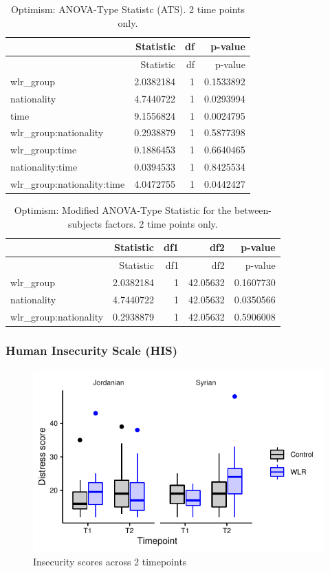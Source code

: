 \documentclass[]{article}
\begin{document}
\begin{longtable}[]{@{}lrrr@{}}
\caption{Optimism: ANOVA-Type Statistc (ATS). 2 time points
only.}\tabularnewline
\toprule
& Statistic & df & p-value\tabularnewline
\midrule
\endfirsthead
\toprule
& Statistic & df & p-value\tabularnewline
\midrule
\endhead
wlr\_group & 2.0382184 & 1 & 0.1533892\tabularnewline
nationality & 4.7440722 & 1 & 0.0293994\tabularnewline
time & 9.1556824 & 1 & 0.0024795\tabularnewline
wlr\_group:nationality & 0.2938879 & 1 & 0.5877398\tabularnewline
wlr\_group:time & 0.1886453 & 1 & 0.6640465\tabularnewline
nationality:time & 0.0394533 & 1 & 0.8425534\tabularnewline
wlr\_group:nationality:time & 4.0472755 & 1 & 0.0442427\tabularnewline
\bottomrule
\end{longtable}

\begin{longtable}[]{@{}lrrrr@{}}
\caption{Optimism: Modified ANOVA-Type Statistic for the
between-subjects factors. 2 time points only.}\tabularnewline
\toprule
& Statistic & df1 & df2 & p-value\tabularnewline
\midrule
\endfirsthead
\toprule
& Statistic & df1 & df2 & p-value\tabularnewline
\midrule
\endhead
wlr\_group & 2.0382184 & 1 & 42.05632 & 0.1607730\tabularnewline
nationality & 4.7440722 & 1 & 42.05632 & 0.0350566\tabularnewline
wlr\_group:nationality & 0.2938879 & 1 & 42.05632 &
0.5906008\tabularnewline
\bottomrule
\end{longtable}

\newpage

\hypertarget{human-insecurity-scale-his-1}{%
\subsubsection{Human Insecurity Scale
(HIS)}\label{human-insecurity-scale-his-1}}

\begin{figure}[H]

{\centering \includegraphics{WLR-analyses-report_files/figure-latex/unnamed-chunk-34-1} 

}

\caption{Insecurity scores across 2 timepoints}\label{fig:unnamed-chunk-34}
\end{figure}
\end{document}
